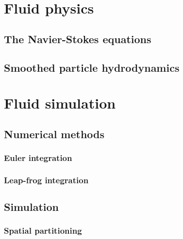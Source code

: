 \documentclass[paper=a4, fontsize=11pt]{report}
\numberwithin{equation}{section} %
\numberwithin{figure}{section} %
\numberwithin{table}{section} %
\begin{document}

\chapter{Fluid physics}

\section{The Navier-Stokes equations}

\section{Smoothed particle hydrodynamics}

\chapter{Fluid simulation}
\section{Numerical methods}
\subsection{Euler integration}
\subsection{Leap-frog integration}

\section{Simulation}
\subsection{Spatial partitioning}
\end{document}
